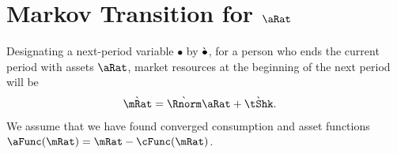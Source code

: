 \documentclass[../BufferStockTheory.tex]{subfiles}\usepackage{ApndxSteadyState}
\begin{document}
  \pagebreak


  \section{Markov Transition for $\aRat$}

  \begin{comment}
    Our derivations will be for consumers who are living in the `true' economy.  In that economy, the transition equation for $\aRat$ is:
    \subsection{Transition for $\aRat$}
    \begin{equation}\begin{gathered}\begin{aligned}
      \aRat_{\tAbs+1} & = \Rfree (\PGro \pShk_{\tAbs+1})^{-1} \aRat_{\tAbs} + \tShk_{\tAbs+1} - \cFunc_{\tAbs+1}(\Rfree (\PGro \pShk_{\tAbs+1})^{-1}\aRat_{\tAbs}+\tShk_{\tAbs+1})
      \\                \Nxt{_{\tAbs+1}^{\aRat}(\aRat_{\tAbs+1}) & = \CDF_{\tAbs+1}^{\aRat}\left(\Rfree (\PGro \pShk_{\tAbs+1})^{-1} \aRat_{\tAbs} + \tShk_{\tAbs+1} - \cFunc_{\tAbs+1}(\Rfree (\PGro \pShk_{\tAbs+1})^{-1}\aRat_{\tAbs}+\tShk_{\tAbs+1})\right)
    \end{aligned}\end{gathered}\end{equation}
  \end{comment}

  Designating a next-period variable $\bullet$ by $\grave{\bullet}$, for a person who ends the current period with assets $\point$, market resources at the beginning of the next period will be
  \begin{equation}\begin{gathered}\begin{aligned}
    \Nxt{\mRat} & = \Nxt{\Rnorm}\point+\Nxt{\tShk}.
  \end{aligned}\end{gathered}\end{equation}
  We assume that we have found converged consumption and asset functions $\aFunc(\mRat)=\mRat-\cFunc(\mRat)$.  
  
\end{document}
